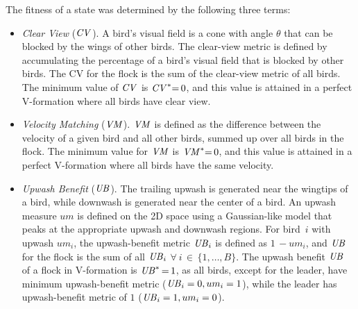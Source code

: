 The fitness of a state was determined by the following three terms: 
\begin{itemize}
	\vspace*{-1.4mm}\item \emph{Clear View} (${\it CV}$). A bird's visual field is a cone with 
    angle $\theta$ that can be blocked by the wings of other birds. 
    The clear-view metric is defined by accumulating the percentage of a bird's visual 
    field that is blocked by other birds. The CV for the flock is the sum of the clear-view
    metric of all birds. The minimum value of ${\it CV}$ 
    is ${\it CV}^*{=}\,0$, and this value is attained in a perfect V-formation where all birds have clear view.
    
	\vspace*{1mm}\item \emph{Velocity Matching} (${\it VM}$). ${\it VM}$ is defined as the  
	difference between the velocity of a given bird and all other birds, 
    summed up over all birds in the flock. The minimum
    value for ${\it VM}$ is ${\it VM}^*{=}\,0$, and this value is attained in a perfect
    V-formation where all birds have the same 
    velocity.
    
	\vspace*{1mm}\item \emph{Upwash Benefit} (${\it UB}$). The trailing upwash is 
    generated near the wingtips of a bird, while downwash is generated near 
    the center of a bird.  An upwash measure $um$ is defined on the 2D space using a 
    Gaussian-like model that peaks at the appropriate upwash and downwash regions. 
    For bird~$i$ with upwash $um_i$, the upwash-benefit metric ${\it UB}_i$ is defined as
    $1\,{-}um_i$, and ${\it UB}$ for the flock is the sum of all ${\it UB}_i$ $\forall~i\,{\in}\,\{1,\ldots,B\}$.
    The upwash benefit ${\it UB}$ of a flock in V-formation is ${\it UB}^*\,{=}\,1$, as all birds, except for the leader, have 
    minimum upwash-benefit metric (${\it UB}_i=0, um_i=1$),
    while the leader has upwash-benefit metric of $1$ (${\it UB}_i=1, um_i=0$).
\end{itemize}

